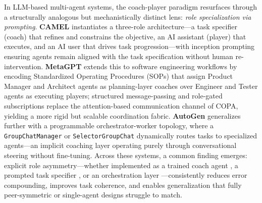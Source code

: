 \documentclass[12pt, a4paper]{article}
\begin{document}
In LLM-based multi-agent systems, the coach-player paradigm resurfaces through a structurally
analogous but mechanistically distinct lens: \textit{role specialization via prompting}.
\textbf{CAMEL} \parencite{li2023camel} instantiates a three-role architecture---a task specifier
(coach) that refines and constrains the objective, an AI assistant (player) that executes, and an
AI user that drives task progression---with inception prompting ensuring agents remain aligned
with the task specification without human re-intervention. \textbf{MetaGPT}
\parencite{hong2024metagpt} extends this to software engineering workflows by encoding
Standardized Operating Procedures (SOPs) that assign Product Manager and Architect agents as
planning-layer coaches over Engineer and Tester agents as executing players; structured
message-passing and role-gated subscriptions replace the attention-based communication channel
of COPA, yielding a more rigid but scalable coordination fabric. \textbf{AutoGen}
\parencite{wu2024autogen} generalizes further with a programmable orchestrator-worker topology,
where a \texttt{GroupChatManager} or \texttt{SelectorGroupChat} dynamically routes tasks to
specialized agents---an implicit coaching layer operating purely through conversational steering
without fine-tuning. Across these systems, a common finding emerges: explicit role
asymmetry---whether implemented as a trained coach agent \parencite{liu2021copa}, a prompted
task specifier \parencite{li2023camel}, or an orchestration layer
\parencite{hong2024metagpt, wu2024autogen}---consistently reduces error compounding, improves
task coherence, and enables generalization that fully peer-symmetric or single-agent designs
struggle to match.

\printbibliography
\end{document}
